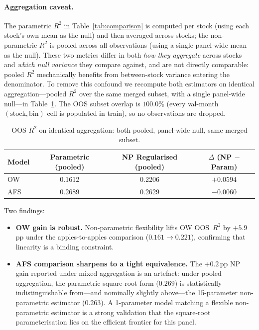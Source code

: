 \documentclass[11pt,a4paper]{article}
\begin{document}
\paragraph{Aggregation caveat.}  The parametric $R^2$ in
Table~\ref{tab:comparison} is computed per stock (using each stock's
own mean as the null) and then averaged across stocks; the
non-parametric $R^2$ is pooled across all observations (using a single
panel-wide mean as the null).  These two metrics differ in both
\emph{how they aggregate} across stocks and \emph{which null variance}
they compare against, and are not directly comparable: pooled $R^2$
mechanically benefits from between-stock variance entering the
denominator.  To remove this confound we recompute both estimators on
identical aggregation---pooled $R^2$ over the same merged subset, with
a single panel-wide null---in Table~\ref{tab:apples}.  The OOS subset
overlap is $100.0\%$ (every val-month $(\text{stock},\text{bin})$ cell
is populated in train), so no observations are dropped.

\begin{table}[H]
\centering\small
\caption{OOS $R^2$ on identical aggregation: both pooled, panel-wide
         null, same merged subset.}
\label{tab:apples}
\begin{tabular}{lccc}
\toprule
Model & Parametric (pooled) & NP Regularised (pooled) & $\Delta$ (NP $-$ Param) \\
\midrule
OW  & 0.1612 & 0.2206 & $+0.0594$ \\
AFS & 0.2689 & 0.2629 & $-0.0060$ \\
\bottomrule
\end{tabular}
\end{table}

Two findings:
\begin{itemize}
  \item \textbf{OW gain is robust.}  Non-parametric flexibility lifts
        OW OOS~$R^2$ by $+5.9$\,pp under the apples-to-apples
        comparison ($0.161 \to 0.221$), confirming that linearity is a
        binding constraint.
  \item \textbf{AFS comparison sharpens to a tight equivalence.}  The
        $+0.2$\,pp NP gain reported under mixed aggregation is an
        artefact: under pooled aggregation, the parametric square-root
        form ($0.269$) is statistically indistinguishable from---and
        nominally slightly above---the 15-parameter non-parametric
        estimator ($0.263$).  A 1-parameter model matching a flexible
        non-parametric estimator is a strong validation that the
        square-root parameterisation lies on the efficient frontier
        for this panel.
\end{itemize}
\end{document}

